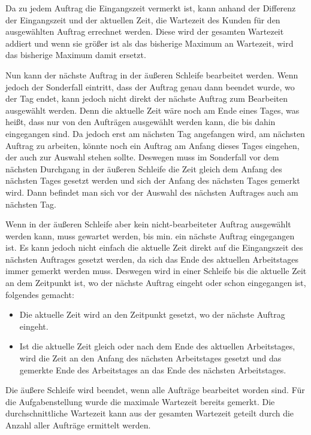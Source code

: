 \documentclass[a4paper,10pt,ngerman]{scrartcl}
\begin{document}
Da zu jedem Auftrag die Eingangszeit vermerkt ist,
kann anhand der Differenz der Eingangszeit
und der aktuellen Zeit, die Wartezeit des Kunden für den ausgewählten Auftrag errechnet werden.
Diese wird der gesamten Wartezeit addiert
und wenn sie größer ist als das bisherige Maximum an Wartezeit,
wird das bisherige Maximum damit ersetzt.

Nun kann der nächste Auftrag in der äußeren Schleife bearbeitet werden.
Wenn jedoch der Sonderfall eintritt, dass der Auftrag genau dann beendet wurde,
wo der Tag endet,
kann jedoch nicht direkt
der nächste Auftrag zum Bearbeiten ausgewählt werden.
Denn die aktuelle Zeit wäre noch am Ende eines Tages,
was heißt, dass nur von den Aufträgen ausgewählt werden kann,
die bis dahin eingegangen sind.
Da jedoch erst am nächsten Tag angefangen wird,
am nächsten Auftrag zu arbeiten,
könnte noch ein Auftrag am Anfang dieses Tages eingehen, der auch zur Auswahl stehen sollte.
Deswegen muss im Sonderfall vor dem nächsten Durchgang in der äußeren Schleife
die Zeit gleich dem Anfang des nächsten Tages gesetzt werden 
und sich der Anfang des nächsten Tages gemerkt wird.
Dann befindet man sich vor der Auswahl des nächsten Auftrages auch am nächsten Tag.

Wenn in der äußeren Schleife aber kein nicht-bearbeiteter Auftrag ausgewählt werden kann,
muss gewartet werden, bis min. ein nächste Auftrag eingegangen ist.
Es kann jedoch nicht einfach die aktuelle Zeit direkt
auf die Eingangszeit des nächsten Auftrages gesetzt werden,
da sich das Ende des aktuellen Arbeitstages immer gemerkt werden muss.
Deswegen wird in einer Schleife
bis die aktuelle Zeit an dem Zeitpunkt ist,
wo der nächste Auftrag eingeht oder schon eingegangen ist, folgendes gemacht:
\begin{itemize}
\item Die aktuelle Zeit wird an den Zeitpunkt gesetzt,
wo der nächste Auftrag eingeht.
\item Ist die aktuelle Zeit gleich oder nach dem Ende des aktuellen Arbeitstages,
wird die Zeit an den Anfang des nächsten Arbeitstages gesetzt
und das gemerkte Ende des Arbeitstages an das Ende des nächsten Arbeitstages.
\end{itemize}

Die äußere Schleife wird beendet,
wenn alle Aufträge bearbeitet worden sind.
Für die Aufgabenstellung wurde die maximale Wartezeit bereits gemerkt.
Die durchschnittliche Wartezeit
kann aus der gesamten Wartezeit geteilt
durch die Anzahl aller Aufträge ermittelt werden.
\end{document}
